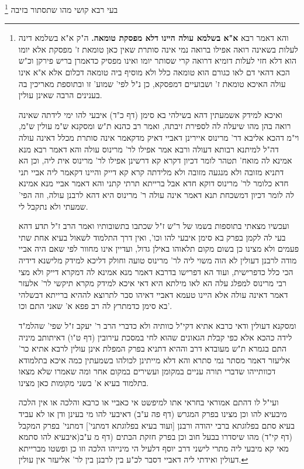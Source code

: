 \documentclass[12pt, openany]{book}
\newcommand{\footnotecomment}[1]{\footnote{#1}}
\newcommand{\commenta}[1]{\footnotecomment{#1}}
\begin{document}
{בעי רבא  קושי מהו שתסתור בזיבה 
\commenta{והא דאמר רבא \textbf{א"א בשלמא עולה היינו דלא מפסקת טומאה.}  ה"ק א"א בשלמא דינה לעלות בשאינה רואה אפילו ברואה נמי אינה סותרת שאין כאן טומאת ז' מפסקת אלא יומו הוא דלא חזי לעלות דומיא דרואה קרי שסותר יומו ואינו מפסיק כדאמרן בריש פירקן וכ"ש הכא דהאי דם לאו כגורם הוא טומאה כלל ולא מוסיף ביה טומאה דכלום אלא א"א אינו עולה האיכא טומאת ז' ושבועיים דמפסקא, כן נ"ל לפי' שמוע' זו ובתוספת מאריכין בה בענינים הרבה שאינן עולין.\par  ואיכא למידק אשמעתין דהא בשילהי בא סימן (דף כ"ד) איבעי להו ימי לידתה שאינה רואה בהן מהו שיעלה לה לספירת זיבתה, ואמר רב כהנא ת"ש ומסקנא ש"מ עולין ש"מ, וי"מ דהכא אליבא דר' מרינוס איירינן דאביי דאיק מדקאמר אינה סותרת מכלל דאינה עולה דה"ל למיתנא רבותא דעולה ורבא אמר אפילו לר' מרינוס עולה והא דאמר רבא מנא אמינא לה מואח' תטהר לומר דכיון דקרא קא דרשינן אפילו לר' מרינוס אית ליה, וכן הא דתניא מזובה ולא מנגעה מזובה ולא מלידתה קרא קא דייק והיינו דקאמר ליה אביי תני חדא כלומר לר' מרינוס דוקא חדא אבל ברייתא תרתי קתני והא דאמר אביי מנא אמינא לה לומר דכיון דמשכחת תנא דאמר אינה עולה ר' מרינוס היא דהא לרבנן עולה, וזה הפי' שמעתי ולא נתקבל לי.\par ועכשיו מצאתי בתוספות בשמו של ר"ש ז"ל שכתבו בתשובותיו ואמר הרב ז"ל תדע דהא בעי לה לקמן בפרק בא סימן איבעי להו וכו', ואין דרך התלמוד לשאול בעיא אחת שתי פעמים ולא מצינו כן בשום מקום תלאוהו באילן גדול, ועדיין אינו מחוור לפי שאם היה אביי מודה לרבנן דעולין לא הוה משוי ליה לר' מרינוס טועה וחולק דליכא למידק מלישנא דידיה הכי כלל כדפרישית, ועוד הא דפרישו בדרבא דאמר מנא אמינא לה דמקרא דייק ולא מצי רבי מרינוס למפלג עלה הא לאו מילתא היא דאי איכא למידק מקרא תיקשי לר' אלעזר דאמר דאינה עולה אלא היינו טעמא דאביי דאיהו סבר לתרוצא לההיא ברייתא דבשלהי בא סימן כדמתרץ לה רב פפא א' שאני התם וכו'.\par  ומסקנא דעולין ודאי כרבא אתיא דקי"ל כוותיה ולא כדברי הרב ר' יעקב ז"ל שפי' שהלמ"ד לידה כהכא אלא כפי קבלת הגאונים שהוא לחי במסכת עירובין (דף ט"ו) דאיתותב מיניה התם בגמרא ת"ש מעובדא דרב וההיא דתניא בפרק המפלת אינן עולין לרבא אתיא כר' אליעזר דאמר מסתר נמי סתרא והא דלא מייתינן לכולהו בשמעתין כמה איכא בתלמודא דכוותייהו שדברי תורה עניים במקומן ועשירים במקום אחר ומה שאמרו שלא מצאו בתלמוד בעיא א' בשני מקומות כאן מצינו.\par  ועי"ל לו דהתם אמוראי בחראי אתו למיפשט אי כאביי או כרבא והלכה או אין הלכה מיבעיא להו וכן מצינו בפרק המגרש (דף פה ע"ב) דאיבעי להו מי בעינן ודן או לא עביד בעיא סתם בפלוגתא ברבי יהודה ורבנן [ועוד בעיא בפלוגתא דמתני'] דמתני' בפרק המקבל (דף קי"ד) מהו שיסדרו בבעל חוב וכן בפרק חזקת הבתים (דף מ ע"ב(איבעיא להו סתמא מאי קא מיבעי ליה מתרי לישני דרב יוסף דלעיל הי מינייהו הלכה וזו כן ופשטו מברייתא דעולין ואידתי ליה דאביי דסבר לכ"ע בין לרבנן בין לר' אליעזר אין עולין. }

}
\end{document}
